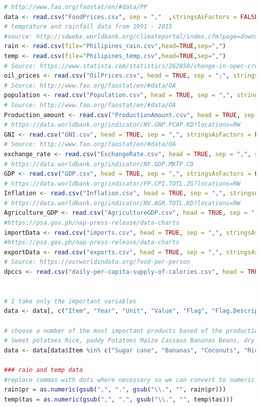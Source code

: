 \documentclass[11pt]{article}
\begin{document}
\begin{lstlisting}[language= R]
# http://www.fao.org/faostat/en/#data/PP
data <- read.csv("FoodPrices.csv", sep = ","  ,stringsAsFactors = FALSE)
# temprature and rainfall data from 1991 - 2015
#source: http://sdwebx.worldbank.org/climateportal/index.cfm?page=downscaled_data_download&menu=historical
rain <- read.csv(file="Philipines_rain.csv",head=TRUE,sep=",")
temp <- read.csv(file="Philipines_temp.csv",head=TRUE,sep=",")
# Source: https://www.statista.com/statistics/262858/change-in-opec-crude-oil-prices-since-1960/
oil_prices <- read.csv("OilPrices.csv", head = TRUE, sep = ";", stringsAsFactors = FALSE)
# Source: http://www.fao.org/faostat/en/#data/OA
population <- read.csv("Population.csv", head = TRUE, sep = ",", stringsAsFactors = FALSE)
# Source: http://www.fao.org/faostat/en/#data/OA
Production_amount <- read.csv("ProductionAmount.csv", head = TRUE, sep = ",", stringsAsFactors = FALSE)
# https://data.worldbank.org/indicator/NY.GNP.PCAP.KD?locations=RW
GNI <- read.csv("GNI.csv", head = TRUE, sep = ",", stringsAsFactors = FALSE)
# Source: http://www.fao.org/faostat/en/#data/OA
exchange_rate <- read.csv("ExchangeRate.csv", head = TRUE, sep = ",", stringsAsFactors = FALSE)
# https://data.worldbank.org/indicator/NY.GDP.MKTP.CD
GDP <- read.csv("GDP.csv", head = TRUE, sep = ",", stringsAsFactors = FALSE)
# https://data.worldbank.org/indicator/FP.CPI.TOTL.ZG?locations=RW
Inflation <- read.csv("Inflation.csv", head = TRUE, sep = ",", stringsAsFactors = FALSE)
# https://data.worldbank.org/indicator/NV.AGR.TOTL.KD?locations=RW
Agriculture_GDP <- read.csv("AgricultureGDP.csv", head = TRUE, sep = ",", stringsAsFactors = FALSE)
#https://psa.gov.ph/nap-press-release/data-charts
importData <- read.csv("imports.csv", head = TRUE, sep = ",", stringsAsFactors = FALSE)
#https://psa.gov.ph/nap-press-release/data-charts
exportData <- read.csv("exports.csv", head = TRUE, sep = ",", stringsAsFactors = FALSE)
# Source: https://ourworldindata.org/food-per-person
dpccs <- read.csv("daily-per-capita-supply-of-calories.csv", head = TRUE, sep = ",", stringsAsFactors = FALSE)


# I take only the important variables 
data <- data[, c("Item", "Year", "Unit", "Value", "Flag", "Flag.Description")]

# choose a number of the most important products based of the production quantity 
# Sweet potatoes Rice, paddy Potatoes Maize Cassava Bananas Beans, dry
data <- data[data$Item %in% c("Sugar cane", "Bananas", "Coconuts", "Rice, paddy"),]

### rain and temp data 
#replace commas with dots where necessary so we can convert to numeric
rain$pr = as.numeric(gsub(",", ".", gsub("\\.", "", rain$pr)))
temp$tas = as.numeric(gsub(",", ".", gsub("\\.", "", temp$tas)))


\end{lstlisting}
\end{document}
